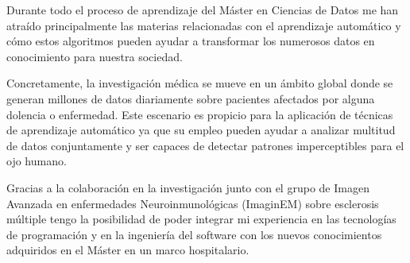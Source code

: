 Durante todo el proceso de aprendizaje del Máster en Ciencias de Datos me han atraído principalmente las materias relacionadas con el aprendizaje automático y cómo estos algoritmos pueden ayudar a transformar los numerosos datos en conocimiento para nuestra sociedad. 

Concretamente, la investigación médica se mueve en un ámbito global donde se generan millones de datos diariamente sobre pacientes afectados por alguna dolencia o enfermedad. Este escenario es propicio para la aplicación de técnicas de aprendizaje automático ya que su empleo  pueden ayudar a analizar multitud de datos conjuntamente y ser capaces de detectar patrones imperceptibles para el ojo  humano.

Gracias a la colaboración en la investigación junto con el grupo de Imagen Avanzada en enfermedades Neuroinmunológicas (ImaginEM) sobre esclerosis múltiple tengo la posibilidad de poder integrar mi experiencia en las tecnologías de programación y en la ingeniería del software con los nuevos conocimientos adquiridos en el Máster en un marco hospitalario.
